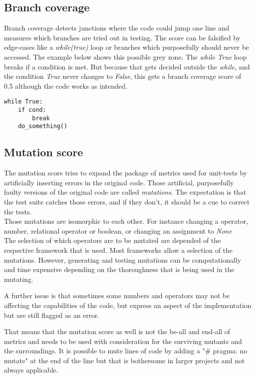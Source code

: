 \documentclass[a4paper,11pt,oneside]{memoir}
\begin{document}
\subsection{Branch coverage}
Branch coverage detects junctions where the code could jump one line and measures which branches are tried out in testing. The score can be falsified by edge-cases like a \textit{while(true)} loop or branches which purposefully should never be accessed.
The example below shows this possible grey zone.
The \textit{while True} loop breaks if a condition is met. But because that gets decided outside the \textit{while}, and the condition \textit{True} never changes to \textit{False}, this gets a branch coverage score of 0.5 although the code works as intended.

\begin{verbatim}
while True:
    if cond:
        break
    do_something()
\end{verbatim}

\subsection{Mutation score}
The mutation score tries to expand the package of metrics used for unit-tests by artificially inserting errors in the original code. Those artificial, purposefully faulty versions of the original code are called \textit{mutations}. The expectation is that the test suite catches those errors, and if they don't, it should be a cue to correct the tests.\\
Those mutations are isomorphic to each other. For instance changing a operator, number, relational operator or boolean, or changing an assignment to \textit{None}\\
The selection of which operators are to be mutated are depended of the respective framework that is used. Most frameworks allow a selection of the mutations. However, generating and testing mutations can be computationally and time expensive depending on the thoroughness that is being used in the mutating.

A further issue is that sometimes some numbers and operators may not be affecting the capabilities of the code, but express an aspect of the implementation but are still flagged as an error.

That means that the mutation score as well is not the be-all and end-all of metrics and needs to be used with consideration for the surviving mutants and the surroundings. It is possible to mute lines of code by adding a "\# pragma: no mutate" at the end of the line but that is bothersome in larger projects and not always applicable.
\end{document}
